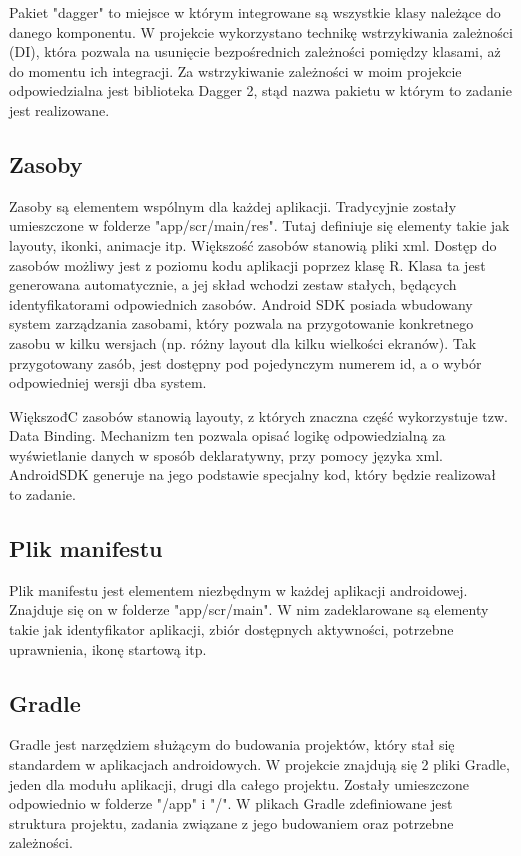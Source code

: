 \documentclass{xmgr}
\begin{document}
Pakiet "dagger" to miejsce w którym integrowane są wszystkie klasy należące do danego komponentu. W projekcie wykorzystano technikę wstrzykiwania zależności (DI), która pozwala na usunięcie bezpośrednich zależności pomiędzy klasami, aż do momentu ich integracji. Za wstrzykiwanie zależności w moim projekcie odpowiedzialna jest biblioteka Dagger 2, stąd nazwa pakietu w którym to zadanie jest realizowane.

\subsection{Zasoby}
Zasoby są elementem wspólnym dla każdej aplikacji. Tradycyjnie zostały umieszczone w folderze "app/scr/main/res". Tutaj definiuje się elementy takie jak layouty, ikonki, animacje itp. Większość zasobów stanowią pliki xml. Dostęp do zasobów możliwy jest z poziomu kodu aplikacji poprzez klasę R. Klasa ta jest generowana automatycznie, a jej skład wchodzi zestaw stałych, będących identyfikatorami odpowiednich zasobów. Android SDK posiada wbudowany system zarządzania zasobami, który pozwala na przygotowanie konkretnego zasobu w kilku wersjach (np. różny layout dla kilku wielkości ekranów). Tak przygotowany zasób, jest dostępny pod pojedynczym numerem id, a o wybór odpowiedniej wersji dba system.

WiększođC zasobów stanowią layouty, z których znaczna część wykorzystuje tzw. Data Binding. Mechanizm ten pozwala opisać logikę odpowiedzialną za wyświetlanie danych w sposób deklaratywny, przy pomocy języka xml. AndroidSDK generuje na jego podstawie specjalny kod, który będzie realizował to zadanie. 

\subsection{Plik manifestu}
Plik manifestu jest elementem niezbędnym w każdej aplikacji androidowej. Znajduje się on w folderze "app/scr/main". W nim zadeklarowane są elementy takie jak identyfikator aplikacji, zbiór dostępnych aktywności, potrzebne uprawnienia, ikonę startową itp.

\subsection{Gradle}
Gradle jest narzędziem służącym do budowania projektów, który stał się standardem w aplikacjach androidowych. W projekcie znajdują się 2 pliki Gradle, jeden dla modułu aplikacji, drugi dla całego projektu. Zostały umieszczone odpowiednio w folderze "/app" i "/". W plikach Gradle zdefiniowane jest struktura projektu, zadania związane z jego budowaniem oraz potrzebne zależności.
\end{document}
